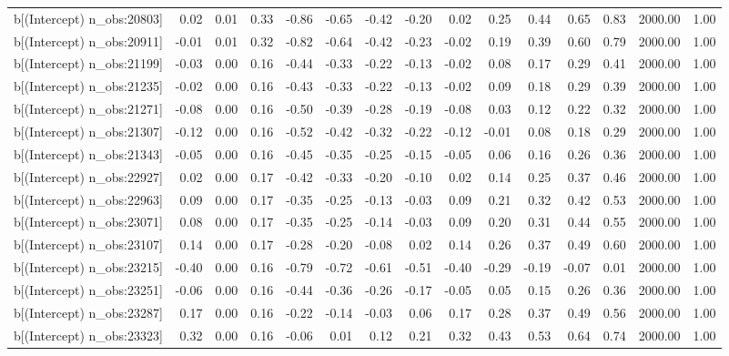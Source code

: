 \begin{table}[ht]
\begin{tabular}{rrrrrrrrrrrrrrr}
  b[(Intercept) n\_obs:20803] & 0.02 & 0.01 & 0.33 & -0.86 & -0.65 & -0.42 & -0.20 & 0.02 & 0.25 & 0.44 & 0.65 & 0.83 & 2000.00 & 1.00 \\ 
  b[(Intercept) n\_obs:20911] & -0.01 & 0.01 & 0.32 & -0.82 & -0.64 & -0.42 & -0.23 & -0.02 & 0.19 & 0.39 & 0.60 & 0.79 & 2000.00 & 1.00 \\ 
  b[(Intercept) n\_obs:21199] & -0.03 & 0.00 & 0.16 & -0.44 & -0.33 & -0.22 & -0.13 & -0.02 & 0.08 & 0.17 & 0.29 & 0.41 & 2000.00 & 1.00 \\ 
  b[(Intercept) n\_obs:21235] & -0.02 & 0.00 & 0.16 & -0.43 & -0.33 & -0.22 & -0.13 & -0.02 & 0.09 & 0.18 & 0.29 & 0.39 & 2000.00 & 1.00 \\ 
  b[(Intercept) n\_obs:21271] & -0.08 & 0.00 & 0.16 & -0.50 & -0.39 & -0.28 & -0.19 & -0.08 & 0.03 & 0.12 & 0.22 & 0.32 & 2000.00 & 1.00 \\ 
  b[(Intercept) n\_obs:21307] & -0.12 & 0.00 & 0.16 & -0.52 & -0.42 & -0.32 & -0.22 & -0.12 & -0.01 & 0.08 & 0.18 & 0.29 & 2000.00 & 1.00 \\ 
  b[(Intercept) n\_obs:21343] & -0.05 & 0.00 & 0.16 & -0.45 & -0.35 & -0.25 & -0.15 & -0.05 & 0.06 & 0.16 & 0.26 & 0.36 & 2000.00 & 1.00 \\ 
  b[(Intercept) n\_obs:22927] & 0.02 & 0.00 & 0.17 & -0.42 & -0.33 & -0.20 & -0.10 & 0.02 & 0.14 & 0.25 & 0.37 & 0.46 & 2000.00 & 1.00 \\ 
  b[(Intercept) n\_obs:22963] & 0.09 & 0.00 & 0.17 & -0.35 & -0.25 & -0.13 & -0.03 & 0.09 & 0.21 & 0.32 & 0.42 & 0.53 & 2000.00 & 1.00 \\ 
  b[(Intercept) n\_obs:23071] & 0.08 & 0.00 & 0.17 & -0.35 & -0.25 & -0.14 & -0.03 & 0.09 & 0.20 & 0.31 & 0.44 & 0.55 & 2000.00 & 1.00 \\ 
  b[(Intercept) n\_obs:23107] & 0.14 & 0.00 & 0.17 & -0.28 & -0.20 & -0.08 & 0.02 & 0.14 & 0.26 & 0.37 & 0.49 & 0.60 & 2000.00 & 1.00 \\ 
  b[(Intercept) n\_obs:23215] & -0.40 & 0.00 & 0.16 & -0.79 & -0.72 & -0.61 & -0.51 & -0.40 & -0.29 & -0.19 & -0.07 & 0.01 & 2000.00 & 1.00 \\ 
  b[(Intercept) n\_obs:23251] & -0.06 & 0.00 & 0.16 & -0.44 & -0.36 & -0.26 & -0.17 & -0.05 & 0.05 & 0.15 & 0.26 & 0.36 & 2000.00 & 1.00 \\ 
  b[(Intercept) n\_obs:23287] & 0.17 & 0.00 & 0.16 & -0.22 & -0.14 & -0.03 & 0.06 & 0.17 & 0.28 & 0.37 & 0.49 & 0.56 & 2000.00 & 1.00 \\ 
  b[(Intercept) n\_obs:23323] & 0.32 & 0.00 & 0.16 & -0.06 & 0.01 & 0.12 & 0.21 & 0.32 & 0.43 & 0.53 & 0.64 & 0.74 & 2000.00 & 1.00 \\ 

\end{tabular}
\end{table}
